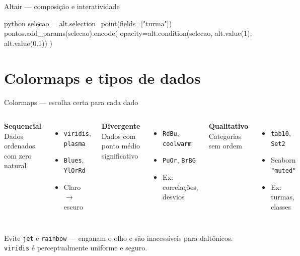 \documentclass[xcolor=dvipsnames,t,aspectratio=169]{beamer}
\begin{document}
\begin{frame}[c, fragile]{Altair — composição e interatividade}
\begin{code}{python}
selecao = alt.selection_point(fields=["turma"])
pontos.add_params(selecao).encode(
    opacity=alt.condition(selecao, alt.value(1), alt.value(0.1))
)
\end{code}

\end{frame}


\section{Colormaps e tipos de dados}

\begin{frame}[c]{Colormaps — escolha certa para cada dado}


\begin{columns}
\textbf{\color{nes_dark_purple}Sequencial}\\
Dados ordenados com zero natural
\begin{itemize}
    \item \texttt{viridis}, \texttt{plasma}
    \item \texttt{Blues}, \texttt{YlOrRd}
    \item Claro $\to$ escuro
\end{itemize}

\textbf{\color{nes_dark_purple}Divergente}\\
Dados com ponto médio significativo
\begin{itemize}
    \item \texttt{RdBu}, \texttt{coolwarm}
    \item \texttt{PuOr}, \texttt{BrBG}
    \item Ex: correlações, desvios
\end{itemize}

\textbf{\color{nes_dark_purple}Qualitativo}\\
Categorias sem ordem
\begin{itemize}
    \item \texttt{tab10}, \texttt{Set2}
    \item Seaborn \texttt{"muted"}
    \item Ex: turmas, classes
\end{itemize}
\end{columns}

\vspace{0.8em}

\begin{display}[Acessibilidade]
Evite \texttt{jet} e \texttt{rainbow} — enganam o olho e são inacessíveis para daltônicos. \texttt{viridis} é perceptualmente uniforme e seguro.
\end{display}

\end{frame}
\end{document}

